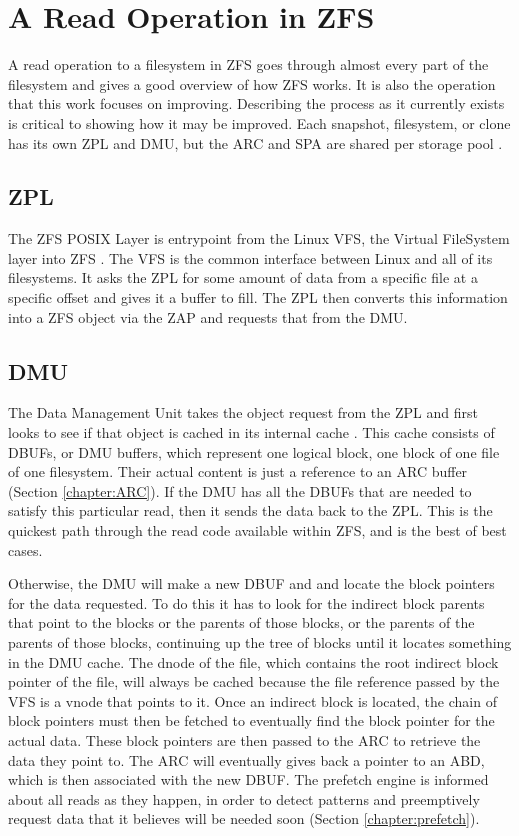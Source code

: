 \section{A Read Operation in ZFS}
A read operation to a filesystem in ZFS goes through almost every part of the filesystem and gives a good overview of how
ZFS works.
It is also the operation that this work focuses on improving.
Describing the process as it currently exists is critical to showing how it may be improved.
Each snapshot, filesystem, or clone has its own ZPL and DMU, but the ARC and SPA are shared per storage pool 
\cite{ahrens_read_write}.

\subsection{ZPL}
The ZFS POSIX Layer is entrypoint from the Linux VFS, the Virtual FileSystem layer into ZFS \cite{ahrens_read_write,zfs}.
The VFS is the common interface between Linux and all of its filesystems.
It asks the ZPL for some amount of data from a specific file at a specific offset and gives it a buffer to fill.
The ZPL then converts this information into a ZFS object via the ZAP and requests that from the DMU.

\subsection{DMU}
The Data Management Unit takes the object request from the ZPL and first looks to see if that object is cached in its internal cache
\cite{ahrens_read_write,zfs}.
This cache consists of DBUFs, or DMU buffers, which represent one logical block, one block of one file of one filesystem.
Their actual content is just a reference to an ARC buffer (Section \ref{chapter:ARC}).
If the DMU has all the DBUFs that are needed to satisfy this particular read, then it sends the data back to the ZPL.
This is the quickest path through the read code available within ZFS, and is the best of best cases.

Otherwise, the DMU will make a new DBUF and and locate the block pointers for the data requested.
To do this it has to look for the indirect block parents that point to the blocks or the parents of those blocks,
or the parents of the parents of those blocks, 
continuing up the tree of blocks until it locates something in the DMU cache.
The dnode of the file, which contains the root indirect block pointer of the file,
will always be cached because the file reference passed by the VFS is a vnode that points to it.
Once an indirect block is located, the chain of block pointers must then be fetched to eventually 
find the block pointer for the actual data.
These block pointers are then passed to the ARC to retrieve the data they point to.
The ARC will eventually gives back a pointer to an ABD, which is then associated with the new DBUF.
The prefetch engine is informed about all reads as they happen, in order to detect patterns and preemptively
request data that it believes will be needed soon (Section \ref{chapter:prefetch}).

